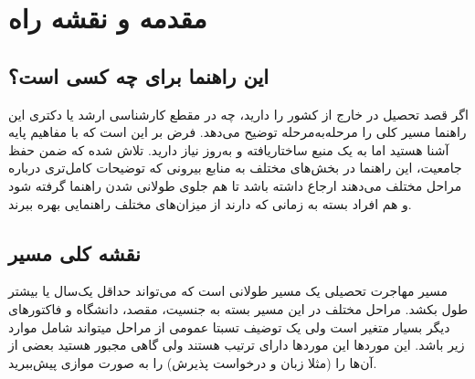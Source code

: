 \chapter{مقدمه و نقشه راه}
\label{ch:introduction}

\section{این راهنما برای چه کسی است؟}

اگر قصد تحصیل در خارج از کشور را دارید، چه در مقطع کارشناسی ارشد
یا دکتری این راهنما مسیر کلی را مرحله‌به‌مرحله توضیح می‌دهد.
فرض بر این است که با مفاهیم پایه آشنا هستید اما به یک منبع ساختاریافته
و به‌روز نیاز دارید.
تلاش شده که ضمن حفظ جامعیت، این راهنما در بخش‌های مختلف به منابع بیرونی که توضیحات کامل‌تری درباره مراحل مختلف 
می‌دهند ارجاع داشته باشد تا هم جلوی طولانی شدن راهنما گرفته شود و هم افراد بسته به زمانی که دارند از 
میزان‌های مختلف راهنمایی بهره ببرند.
\section{نقشه کلی مسیر}
مسیر مهاجرت تحصیلی یک مسیر طولانی است که می‌تواند حداقل یک‌سال یا بیشتر طول بکشد. مراحل مختلف در این مسیر
بسته به جنسیت، مقصد، دانشگاه و فاکتور‌های دیگر بسیار متغیر است ولی یک توضیف تسبتا عمومی از مراحل میتواند شامل موارد زیر باشد. این مورد‌ها 
این مورد‌ها دارای ترتیب هستند ولی گاهی مجبور هستید بعضی از آن‌ها را (مثلا زبان و درخواست پذیرش) را به صورت موازی پیش‌ببرید.

